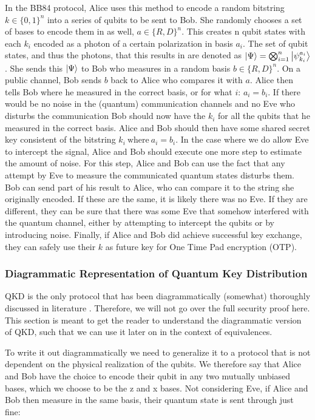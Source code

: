 \documentclass[]{article}
\begin{document}
In the BB84 protocol, Alice uses this method to encode a random bitstring $k \in \{0,1\}^n $ into a series of qubits to be sent to Bob. She randomly chooses a set of bases to encode them in as well,  $a \in \{R, D\}^n$. This creates n qubit states with each $k_i$ encoded as a photon of a certain polarization in basis $a_i$. The set of qubit states, and thus the photons, that this results in are denoted as $\ket{\Psi} = \bigotimes_{i=1}^n \ket{\psi_{k_i}^{a_i}} $. She sends this $\ket{\Psi}$ to Bob who measures in a random basis $b \in \{R, D\}^n$. On a public channel, Bob sends $b$ back to Alice who compares it with $a$. Alice then tells Bob where he measured in the correct basis, or for what $i$: $a_i = b_i$. If there would be no noise in the (quantum) communication channels and no Eve who disturbs the communication Bob should now have the $k_i$ for all the qubits that he measured in the correct basis. Alice and Bob should then have some shared secret key consistent of the bitstring $k_i ~\text{where} ~a_i = b_i$. In the case where we do allow Eve to intercept the signal, Alice and Bob should execute one more step to estimate the amount of noise. For this step, Alice and Bob can use the fact that any attempt by Eve to measure the communicated quantum states disturbs them. Bob can send part of his result to Alice, who can compare it to the string she originally encoded. If these are the same, it is likely there was no Eve. If they are different, they can be sure that there was some Eve that somehow interfered with the quantum channel, either by attempting to intercept the qubits or by introducing noise. Finally, if Alice and Bob did achieve successful key exchange, they can safely use their $k$ as future key for One Time Pad encryption (OTP).

\subsubsection{Diagrammatic Representation of Quantum Key Distribution}
QKD is the only protocol that has been diagrammatically (somewhat) thoroughly discussed in literature \cite{Kissinger2017}. Therefore, we will not go over the full security proof here. This section is meant to get the reader to understand the diagrammatic version of QKD, such that we can use it later on in the context of equivalences.

 To write it out diagrammatically we need to generalize it to a protocol that is not dependent on the physical realization of the qubits. We therefore say that Alice and Bob have the choice to encode their qubit in any two mutually unbiased bases, which we choose to be the z and x bases. Not considering Eve, if Alice and Bob then measure in the same basis, their quantum state is sent through just fine:
\end{document}
